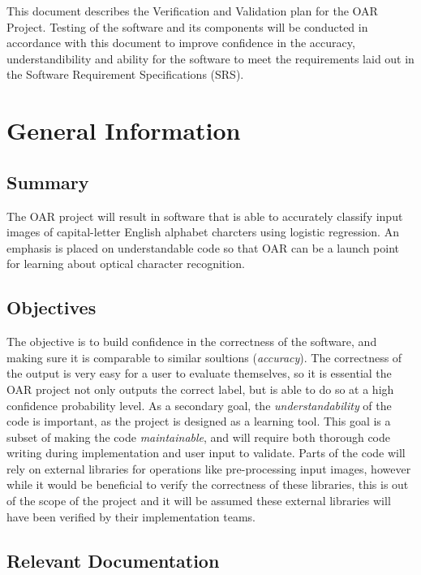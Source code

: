 \documentclass[12pt, titlepage]{article}
\begin{document}
\newpage


This document describes the Verification and Validation plan for the OAR Project. Testing of the software and its components
will be conducted in accordance with this document to improve confidence in the accuracy, understandibility and ability for the software 
to meet the requirements laid out in the Software Requirement Specifications (SRS).

\section{General Information}

\subsection{Summary}

The OAR project will result in software that is able to accurately classify input images of capital-letter English alphabet charcters using
logistic regression. An emphasis is placed on understandable code so that OAR can be a launch point for learning about optical
character recognition.

\subsection{Objectives} \label{Objectives}

The objective is to build confidence in the correctness of the software, and making sure it is comparable
to similar soultions (\textit{accuracy}). The correctness of the output is very easy for a user to evaluate themselves, so
it is essential the OAR project not only outputs the correct label, but is able to do so at a high confidence probability level.  
As a secondary goal, the \textit{understandability} of the code is important, as the project is designed as a learning tool.
This goal is a subset of making the code \textit{maintainable}, and will require both thorough code writing during implementation
and user input to validate. Parts of the code will rely on external libraries for operations like pre-processing input images,
however while it would be beneficial to verify the correctness of these libraries, this is out of the scope of the project and it will 
be assumed these external libraries will have been verified by their implementation teams.

\subsection{Relevant Documentation}
\end{document}
